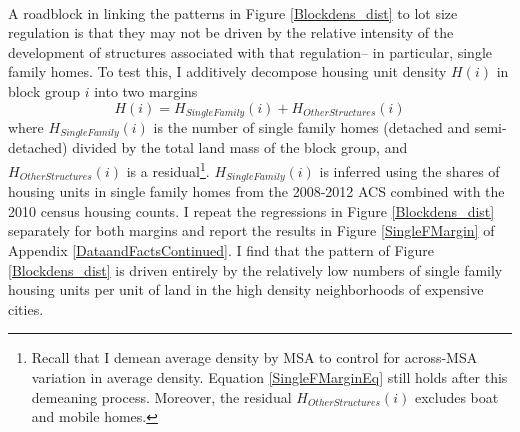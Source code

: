 \documentclass[]{article}
\begin{document}
\paragraph*{}
A roadblock in linking the patterns in Figure \ref{Blockdens_dist} to lot size regulation is that they may not be driven by the relative intensity of the development of structures associated with that regulation-- in particular, single family homes. To test this, I additively decompose housing unit density $H(i)$ in block group $i$ into two margins
\begin{equation}\label{SingleFMarginEq}
	H(i) = H_{Single Family}(i) + H_{Other Structures}(i)
\end{equation} 
where $H_{Single Family}(i)$ is the number of single family homes (detached and semi-detached) divided by the total land mass of the block group, and $H_{Other Structures}(i)$ is a residual\footnote{Recall that I demean average density by MSA to control for across-MSA variation in average density. Equation \eqref{SingleFMarginEq} still holds after this demeaning process. Moreover, the residual $H_{OtherStructures}(i)$ excludes boat and mobile homes.}. $H_{Single Family}(i)$ is inferred using the shares of housing units in single family homes from the 2008-2012 ACS combined with the 2010 census housing counts. I repeat the regressions in Figure \ref{Blockdens_dist} separately for both margins and report the results in Figure \ref{SingleFMargin} of Appendix \ref{DataandFactsContinued}. I find that the pattern of Figure \ref{Blockdens_dist} is driven entirely by the relatively low numbers of single family housing units per unit of land in the high density neighborhoods of expensive cities.
\end{document}
